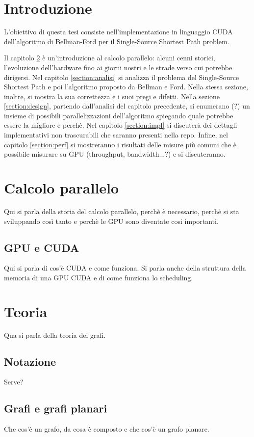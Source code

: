 \documentclass[a4paper]{article}
\begin{document}
	\listofalgorithms
	\newpage
	
	\section{Introduzione}
	L'obiettivo di questa tesi consiste nell'implementazione in linguaggio CUDA dell'algoritmo di Bellman-Ford per il Single-Source Shortest Path problem.
	
	Il capitolo \ref{section:storia} è un'introduzione al calcolo parallelo: alcuni cenni storici, l'evoluzione dell'hardware fino ai giorni nostri e le strade verso cui potrebbe dirigersi. Nel capitolo \ref{section:analisi} si analizza il problema del Single-Source Shortest Path e poi l'algoritmo proposto da Bellman e Ford. Nella stessa sezione, inoltre, si mostra la sua correttezza e i suoi pregi e difetti. Nella sezione \ref{section:design}, partendo dall'analisi del capitolo precedente, si enumerano (?) un insieme di possibili parallelizzazioni dell'algoritmo spiegando quale potrebbe essere la migliore e perchè. Nel capitolo \ref{section:impl} si discuterà dei dettagli implementativi non trascurabili che saranno presenti nella repo. Infine, nel capitolo \ref{section:perf} si mostreranno i risultati delle misure più comuni che è possibile misurare su GPU (throughput, bandwidth...?) e si discuteranno.
	
	\section{Calcolo parallelo}
	\label{section:storia}
	Qui si parla della storia del calcolo parallelo, perchè è necessario, perchè si sta sviluppando così tanto e perchè le GPU sono diventate cosi importanti.
	
	\subsection{GPU e CUDA}
	Qui si parla di cos'è CUDA e come funziona. Si parla anche della struttura della memoria di una GPU CUDA e di come funziona lo scheduling.
	
	\section{Teoria}
	Qua si parla della teoria dei grafi.
	\subsection{Notazione}
	Serve?
	\subsection{Grafi e grafi planari}
	Che cos'è un grafo, da cosa è composto e che cos'è un grafo planare.
\end{document}
